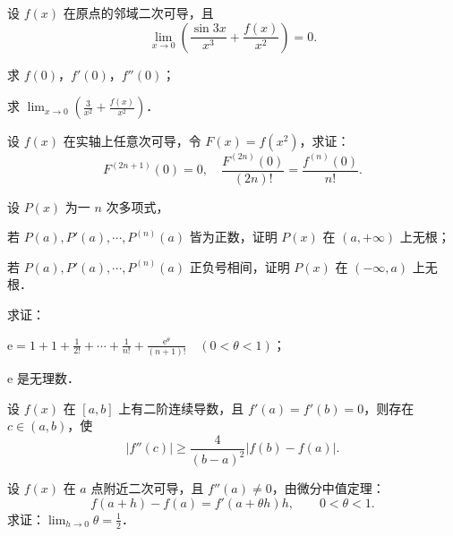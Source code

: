\begin{xiti}
\item 设 $f(x)$ 在原点的邻域二次可导，且
\[
\lim_{x\to0}\left(\frac{\sin 3x}{x^3} + \frac{f(x)}{x^2}\right) = 0.
\]
\begin{ziti}
\item 求 $f(0)$，$f'(0)$，$f''(0)$；
\item 求 $\displaystyle \lim_{x\to0}\left(\frac{3}{x^2} + \frac{f(x)}{x^2}\right)$．
\end{ziti}

\item 设 $f(x)$ 在实轴上任意次可导，令 $F(x) = f(x^2)$，求证：
\[
F^{(2n+1)}(0) = 0, \quad \frac{F^{(2n)}(0)}{(2n)!} = \frac{f^{(n)}(0)}{n!}.
\]

\item 设 $P(x)$ 为一 $n$ 次多项式，
\begin{ziti}
\item 若 $P(a), P'(a), \cdots, P^{(n)}(a)$ 皆为正数，证明 $P(x)$ 在 $(a, +\infty)$ 上无根；
\item 若 $P(a), P'(a), \cdots, P^{(n)}(a)$ 正负号相间，证明 $P(x)$ 在 $(-\infty, a)$ 上无根．
\end{ziti}

\item 求证：
\begin{ziti}
\item $\displaystyle \mathrm{e} = 1 + 1 + \frac{1}{2!} + \cdots + \frac{1}{n!} + \frac{\mathrm{e}^\theta}{(n+1)!} \quad (0 < \theta < 1)$；
\item $\mathrm{e}$ 是无理数．
\end{ziti}

\item 设 $f(x)$ 在 $[a, b]$ 上有二阶连续导数，且 $f'(a) = f'(b) = 0$，则存在 $c \in (a, b)$，使
\[
|f''(c)| \geqslant \frac{4}{(b-a)^2}|f(b) - f(a)|.
\]

\item 设 $f(x)$ 在 $a$ 点附近二次可导，且 $f''(a) \neq 0$，由微分中值定理：
\[
f(a+h) - f(a) = f'(a+\theta h)h, \qquad 0 < \theta < 1.
\]
求证：$\displaystyle \lim_{h\to0}\theta = \frac{1}{2}$．
\end{xiti}
